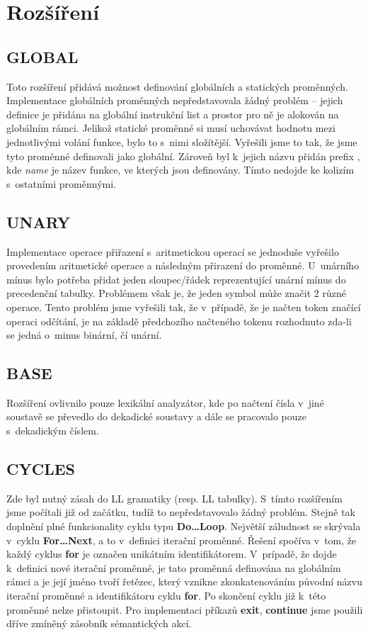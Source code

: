 \documentclass[a4paper,11pt,leqno]{article}
\begin{document}
\section{Rozšíření}
\subsection{GLOBAL}
Toto rozšíření přidává možnost definování globálních a statických proměnných.
Implementace globálních proměnných nepředstavovala žádný problém -- jejich definice je
přidána na globální instrukční list a prostor pro ně je alokován na globálním rámci.
Jelikož statické proměnné si musí uchovávat hodnotu mezi jednotlivými volání funkce, bylo to s~nimi složítější.
Vyřešili jsme to tak, že jsme tyto proměnné definovali jako globální.
Zároveň byl k~jejich názvu přidán prefix ,
kde \emph{name} je název funkce, ve kterých jsou definovány. Tímto nedojde ke
kolizím s~ostatními proměnnými.
\subsection{UNARY}
Implementace operace přiřazení s~aritmetickou operací se jednoduše vyřešilo
provedením aritmetické operace a následným přirazení do proměnné.
U~unárního mínus bylo potřeba přidat jeden sloupec/řádek reprezentující
unární mínus do precedenční tabulky. Problémem však je, že jeden symbol
může značit 2 různé operace. Tento problém jsme vyřešili tak, že v~případě,
že je načten token značící operaci odčítání, je na základě předchozího
načteného tokenu rozhodnuto zda-li se jedná o~minus binární, čí unární.
\subsection{BASE}
Rozšíření ovlivnilo pouze lexikální analyzátor, kde po načtení čísla v~jiné soustavě se převedlo do dekadické soustavy a dále se pracovalo pouze s~dekadickým číslem.
\subsection{CYCLES}
Zde byl nutný zásah do LL gramatiky (resp. LL tabulky). S~tímto 
rozšířením jsme počítali již od začátku, tudíž to nepředstavovalo žádný problém.
Stejně tak doplnění plné funkcionality cyklu typu \textbf{Do\dots Loop}. Největší záludnost se skrývala v~cyklu \textbf{For\dots Next}, a to v~definici iterační proměnné. 
Řešení spočíva v~tom, že každý cyklus \textbf{for} je označen unikátním identifikátorem. V~prípadě, že dojde k~definici nové iterační proměnné, je tato proměnná definována na globálním
rámci a je její jméno tvoří řetězec, který vznikne zkonkatenováním původní názvu
iterační proměnné a identifikátoru cyklu \textbf{for}. Po skončení cyklu již k~této
proměnné nelze přistoupit. Pro implementaci příkazů \textbf{exit}, \textbf{continue} jsme 
použili dříve zmíněný zásobník sémantických akcí.
\end{document}
